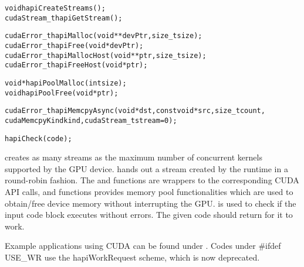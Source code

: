 \begin{alltt}
  void hapiCreateStreams();
  cudaStream\_t hapiGetStream();

  cudaError\_t hapiMalloc(void** devPtr, size\_t size);
  cudaError\_t hapiFree(void* devPtr);
  cudaError\_t hapiMallocHost(void** ptr, size\_t size);
  cudaError\_t hapiFreeHost(void* ptr);

  void* hapiPoolMalloc(int size);
  void hapiPoolFree(void* ptr);

  cudaError\_t hapiMemcpyAsync(void* dst, const void* src, size\_t count,
                              cudaMemcpyKind kind, cudaStream\_t stream = 0);

  hapiCheck(code);
\end{alltt}

 creates as many streams as the maximum number of
concurrent kernels supported by the GPU device.  hands
out a stream created by the runtime in a round-robin fashion. The
 and  functions are wrappers to the corresponding
CUDA API calls, and  functions provides memory pool functionalities
which are used to obtain/free device memory without interrupting the GPU.
 is used to check if the input code block executes without errors.
The given code should return  for it to work.

Example \charmpp{} applications using CUDA can be found under
. Codes under \#ifdef USE\_WR use the hapiWorkRequest
scheme, which is now deprecated.
